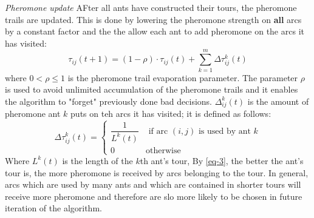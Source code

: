 \documentclass[12pt]{article}
\begin{document}
\textit{Pheromone update } AFter all ants have constructed their tours, the pheromone trails are updated. This is done by lowering the pheromone strength on \textbf{all} arcs by a constant factor and the the allow each ant to add pheromone on the arcs it has visited:
\begin{equation}
    \tau_{ij}(t+1) = (1- \rho) \cdot \tau_{ij}(t) + \sum^{m}_{k =1} \Delta \tau^k_{ij} (t)
\end{equation}
where \(0 < \rho \le 1\) is the pheromone trail evaporation parameter. The parameter \(\rho\) is used to avoid unlimited accumulation of the pheromone trails and it enables the algorithm to "forget" previously done bad decisions.
\(\Delta^k_{ij}(t)\) is the amount of pheromone ant \(k\) puts on teh arcs it has visited; it is defined as follows:
\begin{equation} \label{eq-3}
    \Delta \tau^k_{ij}(t) = \begin{cases}
        \dfrac{1}{L^k (t)} & \text{ if arc } (i,j) \text{ is used by ant } k \\
        0                  & \text{otherwise}
    \end{cases}
\end{equation}
Where \(L^k(t)\) is the length of the \(k\)th ant's tour, By \ref{eq-3}, the better the ant's tour is, the more pheromone is received by arcs belonging to the tour. In general, arcs which are used by many ants and which are contained in shorter tours will receive more pheromone and therefore are slo more likely to be chosen in future iteration of the algorithm.
\end{document}
